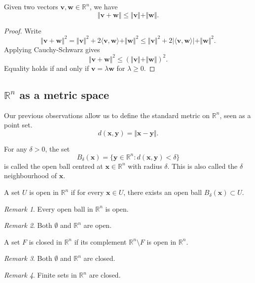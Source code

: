\documentclass[11pt]{article}
\newcommand{\R}{\mathbb{R}}
\newcommand{\ip}[2]{\langle #1, #2 \rangle}
\newcommand{\norm}[1]{\Vert #1 \Vert}
\renewcommand{\vec}[1]{\boldsymbol{#1}}
\newcommand{\vx}{\vec{x}}
\newcommand{\vy}{\vec{y}}
\newcommand{\vv}{\vec{v}}
\newcommand{\vw}{\vec{w}}
\theoremstyle{definition}
\theoremstyle{remark}
\newtheorem*{remark}{Remark}
\numberwithin{equation}{section}
\begin{document}
    \begin{theorem}
        Given two vectors $\vv, \vw \in \R^n$, we have \[
            \norm{\vv + \vw} \leq \norm{\vv} + \norm{\vw}.
        \] 
    \end{theorem}
    \begin{proof}
        Write \[
            \norm{\vv + \vw}^2 = \norm{\vv}^2 + 2\ip{\vv}{\vw} + \norm{\vw}^2
            \leq \norm{\vv}^2 + 2|\ip{\vv}{\vw}| + \norm{\vw}^2.
        \] Applying Cauchy-Schwarz gives \[
            \norm{\vv + \vw}^2 \leq (\norm{\vv} + \norm{\vw})^2.
        \] 
        Equality holds if and only if $\vv = \lambda \vw$ for $\lambda \geq 0$.
    \end{proof}

    \subsection{$\R^n$ as a metric space}

    Our previous observations allow us to define the standard metric on $\R^n$, seen
    as a point set. \[
        d(\vx, \vy) = \norm{\vx - \vy}.
    \] 

    \begin{definition}
        For any $\delta > 0$, the set \[
            B_\delta(\vx) = \{\vy \in \R^n : d(\vx, \vy) < \delta\}
        \] is called the open ball centred at $\vx \in \R^n$ with radius $\delta$.
        This is also called the $\delta$ neighbourhood of $\vx$.
    \end{definition}

    \begin{definition}
        A set $U$ is open in $\R^n$ if for every $\vx \in U$, there exists an
        open ball $B_\delta(\vx) \subset U$.
        \begin{remark}
            Every open ball in $\R^n$ is open.
        \end{remark}
        \begin{remark}
            Both $\emptyset$ and $\R^n$ are open.
        \end{remark}
    \end{definition}
    
    \begin{definition}
        A set $F$ is closed in $\R^n$ if its complement $\R^n \setminus F$ is open in
        $\R^n$.
        \begin{remark}
            Both $\emptyset$ and $\R^n$ are closed.
        \end{remark}
        \begin{remark}
            Finite sets in $\R^n$ are closed.
        \end{remark}
    \end{definition}
\end{document}
